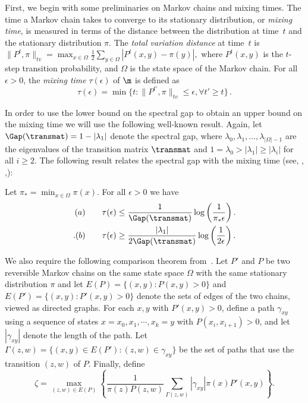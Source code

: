 \documentclass{toc}
\begin{document}
First, we begin with some preliminaries on Markov chains and mixing 
times.  The time a Markov chain takes to converge to its stationary 
distribution, or \emph{mixing time}, is measured in terms of the 
distance between the distribution at time~$t$ and the stationary 
distribution $\pi$. %
 The \emph{total variation distance} at time~$t$ is 
$\|P^t,\pi\| _{tv} = \max_{x\in\Omega}\frac{1}{2}\sum_{y\in\Omega} 
|P^t(x,y)-\pi(y)|,$  %
where $P^t(x,y)$ is the $t$-step transition 
probability, 
and $\Omega$ is the state space of the Markov chain.  %
For all $\epsilon>0$, the \emph{mixing time} 
$\tau(\epsilon)$ of $\m$ is defined as
$$\tau(\epsilon)=\min \{t: \|P^{t'},\pi \|_{tv}\leq \epsilon, \forall t' \geq t\}\,.$$ 

In order to use the lower bound on the spectral gap to obtain an upper bound on the mixing time we will use the following well-known result. 
Again, let $\Gap(\transmat)=1-|\lambda_1|$ denote the spectral gap, where $\lambda_0, \lambda_1, \ldots, \lambda_{|\Omega|-1}$ are the eigenvalues of the transition matrix $\transmat$ and $1=\lambda_0>|\lambda_1|\geq |\lambda_i|$ for all $i\geq 2$. The following result  relates the spectral gap with the mixing time (see, \eg, \cite{sinclair},\cite{RM03}):

%
\begin{theorem}[\cite{RM03}]\label{gap}
Let $\pi_*=\min_{x\in\Omega} \pi (x)$. For all $\epsilon>0$ we have
\begin{align*}
(a)\qquad \tau(\epsilon)&\leq \frac{1}{\Gap(\transmat)} \log\left(\frac{1}{\pi_*\epsilon}\right).\\. %
(b)\qquad \tau(\epsilon)&\geq \frac{|\lambda_1|}{2\Gap(\transmat)} \log\left(\frac{1}{2\epsilon}\right).
%
%
\end{align*}
\end{theorem}
%
%

We also require the following comparison theorem
%
%
{}from~\cite{dsc}.   %
Let $P'$ and $P$ be two
reversible Markov chains on the same state space $\Omega$ with the same 
stationary distribution $\pi$ and let $E(P) = \{(x,y): P(x,y) >
0\}$ and $E(P') = \{(x,y): P'(x,y) > 0\}$ denote the sets of edges of
the two chains, viewed as directed graphs.  For each $x,y$ with
$P'(x,y)>0$, define a path $\gamma_{xy}$ using a sequence of states
$x=x_0,x_1,\cdots,x_k = y$ with $P(x_i,x_{i+1})>0$, and let
$|\gamma_{xy}|$ denote the length of the path.  Let $\Gamma(z,w) =
\{(x,y) \in E(P'): (z,w) \in \gamma_{xy}\}$ be the set of paths that
use the transition $(z,w)$ of $P$.  Finally, define  
\abovedisplayskip=3pt
\belowdisplayskip=3pt
\begin{equation}\label{eqn:zeta}
\zeta = \max_{(z,w) \in E(P)} \left \{\frac{1}{\pi(z)P(z,w)}
\sum_{\Gamma(z,w)}|\gamma_{xy}|\pi(x)P'(x,y) \right \}.
\end{equation}
\end{document}
